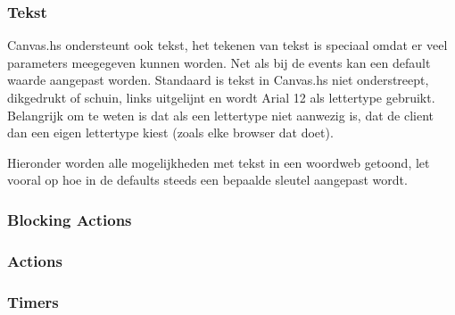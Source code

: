 \subsubsection{Tekst}

Canvas.hs ondersteunt ook tekst, het tekenen van tekst is speciaal omdat er veel parameters meegegeven kunnen worden. Net als bij de events kan een default waarde aangepast worden. Standaard is tekst in Canvas.hs niet onderstreept, dikgedrukt of schuin, links uitgelijnt en wordt Arial 12 als lettertype gebruikt. Belangrijk om te weten is dat als een lettertype niet aanwezig is, dat de client dan een eigen lettertype kiest (zoals elke browser dat doet).

Hieronder worden alle mogelijkheden met tekst in een woordweb getoond, let vooral op hoe in de defaults steeds een bepaalde sleutel aangepast wordt.


\subsubsection{Blocking Actions}

\subsubsection{Actions}

\subsubsection{Timers}

